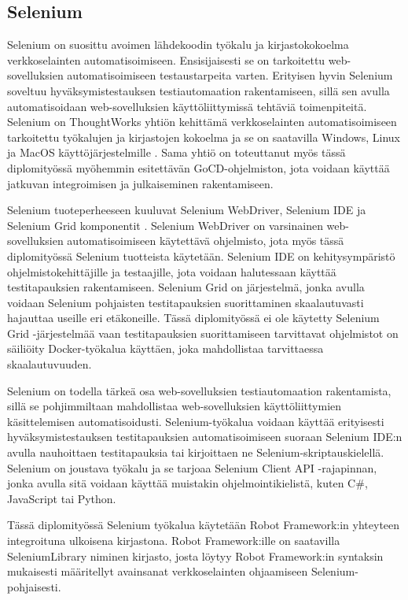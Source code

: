   \subsection{Selenium} \label{ch:08_selenium}

    Selenium on suosittu avoimen lähdekoodin työkalu ja kirjastokokoelma verkkoselainten automatisoimiseen.
    Ensisijaisesti se on tarkoitettu web-sovelluksien automatisoimiseen testaustarpeita varten.
    Erityisen hyvin Selenium soveltuu hyväksymistestauksen testiautomaation rakentamiseen, sillä sen avulla automatisoidaan web-sovelluksien käyttöliittymissä tehtäviä toimenpiteitä.
    Selenium on ThoughtWorks yhtiön kehittämä verkkoselainten automatisoimiseen tarkoitettu työkalujen ja kirjastojen kokoelma ja se on saatavilla Windows, Linux ja MacOS käyttöjärjestelmille \parencite{selenium_info_1}.
    Sama yhtiö on toteuttanut myös tässä diplomityössä myöhemmin esitettävän GoCD-ohjelmiston, jota voidaan käyttää jatkuvan integroimisen ja julkaiseminen rakentamiseen.

    Selenium tuoteperheeseen kuuluvat Selenium WebDriver, Selenium IDE ja Selenium Grid komponentit \parencite{selenium_info_2}.
    Selenium WebDriver on varsinainen web-sovelluksien automatisoimiseen käytettävä ohjelmisto, jota myös tässä diplomityössä Selenium tuotteista käytetään.
    Selenium IDE on kehitysympäristö ohjelmistokehittäjille ja testaajille, jota voidaan halutessaan käyttää testitapauksien rakentamiseen.
    Selenium Grid on järjestelmä, jonka avulla voidaan Selenium pohjaisten testitapauksien suorittaminen skaalautuvasti hajauttaa useille eri etäkoneille.
    Tässä diplomityössä ei ole käytetty Selenium Grid -järjestelmää vaan testitapauksien suorittamiseen tarvittavat ohjelmistot on säiliöity Docker-työkalua käyttäen, joka mahdollistaa tarvittaessa skaalautuvuuden.

    Selenium on todella tärkeä osa web-sovelluksien testiautomaation rakentamista, sillä se pohjimmiltaan mahdollistaa web-sovelluksien käyttöliittymien käsittelemisen automatisoidusti.
    Selenium-työkalua voidaan käyttää erityisesti hyväksymistestauksen testitapauksien automatisoimiseen suoraan Selenium IDE:n avulla nauhoittaen testitapauksia tai kirjoittaen ne Selenium-skriptauskielellä.
    Selenium on joustava työkalu ja se tarjoaa Selenium Client API -rajapinnan, jonka avulla sitä voidaan käyttää muistakin ohjelmointikielistä, kuten C\#, JavaScript tai Python.

    Tässä diplomityössä Selenium työkalua käytetään Robot Framework:in yhteyteen integroituna ulkoisena kirjastona.
    Robot Framework:ille on saatavilla SeleniumLibrary niminen kirjasto, josta löytyy Robot Framework:in syntaksin mukaisesti määritellyt avainsanat verkkoselainten ohjaamiseen Selenium-pohjaisesti.

